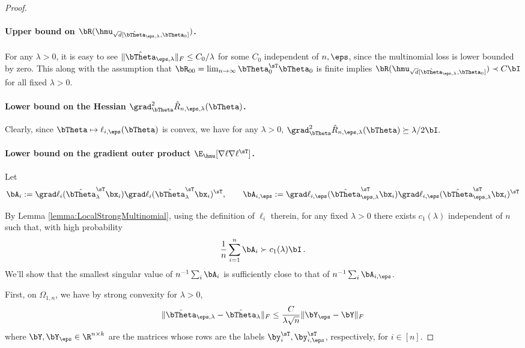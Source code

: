 \begin{proof}
\paragraph{Upper bound on $\bR(\hmu_{\sqrt{d}[\hat\bTheta_{\eps,\lambda},\bTheta_0]})$.}
For any $\lambda >0$, it is easy to see $\|\hat\bTheta_{\eps,\lambda}\|_F \le C_0/\lambda$ for some $C_0$ independent of $n,\eps$, since the multinomial loss is lower bounded by zero.
This along with the assumption that $\bR_{00}=\lim_{n\to\infty}\bTheta_0^{\sT}\bTheta_0$
is finite  implies  $
\bR(\hmu_{\sqrt{d}[\hat\bTheta_{\eps,\lambda},\bTheta_0]})\prec C\bI$ for all fixed $\lambda >0$.

\paragraph{Lower bound on the Hessian $\grad^2_{\bTheta}\hat R_{n,\eps,\lambda}(\bTheta)$.} Clearly, since 
$\bTheta\mapsto \ell_{i,\eps}(\bTheta)$ is convex, we have for any $\lambda >0$, $\grad^2_{\bTheta}\hat R_{n,\eps,\lambda}(\bTheta) \succeq \lambda/2\bI.$ 

\paragraph{Lower bound on the gradient outer product $\E_{\hnu}[\nabla\ell\nabla\ell^{\sT}]$.}

Let
\begin{equation}
    \bA_i := 
    \grad\ell_{i}(\hat\bTheta_\lambda^\sT\bx_i)
    \grad\ell_{i}(\hat\bTheta_\lambda^\sT\bx_i)^\sT,
    \quad\quad
    \bA_{i,\eps} := 
    \grad\ell_{i,\eps}(\hat\bTheta_{\eps,\lambda}^\sT\bx_i)
    \grad\ell_{i,\eps}(\hat\bTheta_{\eps,\lambda}^\sT\bx_i)^\sT
\end{equation}

By Lemma \ref{lemma:LocalStrongMultinomial}, using the definition of $\ell_i$ therein,
 for any fixed $\lambda >0$ there exists $c_1(\lambda)$ independent of $n$
 such that, with high probability
\begin{equation}\label{eq:nablaell_1}
    \frac1n\sum_{i=1}^n \bA_i \succ c_1(\lambda) \bI\, .
\end{equation}
We'll show that the smallest singular value of $n^{-1}\sum_i \bA_i$ is sufficiently close to that of $n^{-1}\sum_{i}\bA_{i,\eps}$.

First, on $\Omega_{1,n}$, we have by strong convexity for $\lambda >0$, 
\begin{equation}
\label{eq:min_lipschitz_in_y}
    \|\hat\bTheta_{\eps,\lambda} - \hat\bTheta_{\lambda}\|_F \le \frac{C}{ \lambda \sqrt{n}} \|\bY_{\eps} - \bY\|_F
\end{equation}
where $\bY,\bY_{\eps} \in\R^{n\times k}$ are the matrices whose rows are the labels $\by_i^\sT,\by_{i,\eps}^\sT$, respectively, for $i\in[n]$.



\end{proof}
